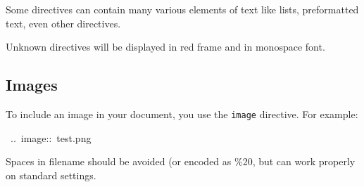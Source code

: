 \documentclass[12pt]{article}
\begin{document}
Some directives can contain many various elements of text like lists,
preformatted text, even other directives.

Unknown directives will be displayed in red frame and in monospace font.

\hypertarget{limages}{}
\subsection{Images}

To include an image in your document, you use the \texttt{image} directive.
For example:

\begin{ttfamily}\begin{flushleft}
\mbox{~..~image::~test.png}\\
\end{flushleft}\end{ttfamily}

Spaces in filename should be avoided (or encoded as \%20, but can work properly
on standard settings.
\end{document}
